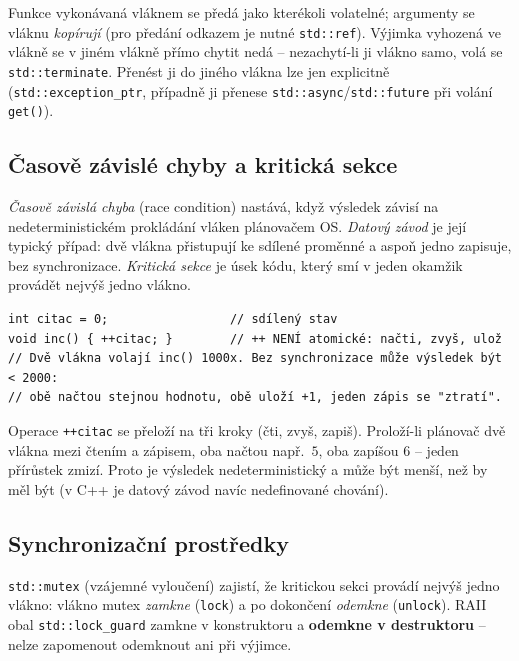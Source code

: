 \documentclass[11pt,a4paper]{article}
\newcommand{\cd}{\lstinline[style=cpp]}
\begin{document}
\begin{poznamka}
Funkce vykonávaná vláknem se předá jako kterékoli volatelné; argumenty se vláknu \emph{kopírují} (pro předání odkazem je nutné \cd{std::ref}). Výjimka vyhozená ve vlákně se v jiném vlákně přímo chytit nedá -- nezachytí-li ji vlákno samo, volá se \cd{std::terminate}. Přenést ji do jiného vlákna lze jen explicitně (\cd{std::exception_ptr}, případně ji přenese \cd{std::async}/\cd{std::future} při volání \cd{get()}).
\end{poznamka}

\subsection{Časově závislé chyby a kritická sekce}

\begin{definice}
\emph{Časově závislá chyba} (race condition) nastává, když výsledek závisí na nedeterministickém prokládání vláken plánovačem OS. \emph{Datový závod} je její typický případ: dvě vlákna přistupují ke sdílené proměnné a aspoň jedno zapisuje, bez synchronizace. \emph{Kritická sekce} je úsek kódu, který smí v jeden okamžik provádět nejvýš jedno vlákno.
\end{definice}

\begin{lstlisting}[style=cpp]
int citac = 0;                 // sdílený stav
void inc() { ++citac; }        // ++ NENÍ atomické: načti, zvyš, ulož
// Dvě vlákna volají inc() 1000x. Bez synchronizace může výsledek být < 2000:
// obě načtou stejnou hodnotu, obě uloží +1, jeden zápis se "ztratí".
\end{lstlisting}

\begin{intuice}
Operace \cd{++citac} se přeloží na tři kroky (čti, zvyš, zapiš). Proloží-li plánovač dvě vlákna mezi čtením a zápisem, oba načtou např.\ $5$, oba zapíšou $6$ -- jeden přírůstek zmizí. Proto je výsledek nedeterministický a může být menší, než by měl být (v C++ je datový závod navíc nedefinované chování).
\end{intuice}

\subsection{Synchronizační prostředky}

\begin{definice}
\cd{std::mutex} (vzájemné vyloučení) zajistí, že kritickou sekci provádí nejvýš jedno vlákno: vlákno mutex \emph{zamkne} (\cd{lock}) a po dokončení \emph{odemkne} (\cd{unlock}). RAII obal \cd{std::lock_guard} zamkne v konstruktoru a \textbf{odemkne v destruktoru} -- nelze zapomenout odemknout ani při výjimce.
\end{definice}
\end{document}
